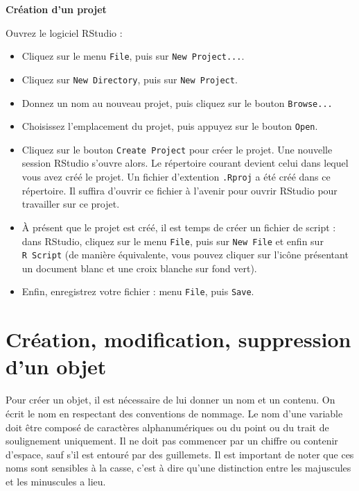 \documentclass[
  11pt,
]{book}
\providecommand{\tightlist}{%
  \setlength{\itemsep}{0pt}\setlength{\parskip}{0pt}}
\numberwithin{equation}{section}
\numberwithin{countremarque}{section}
\newenvironment{greenbox}{
  \begin{tcolorbox}[breakable, colback=vert,coltext=black,
                  colframe=grisfonce]}
 {\end{tcolorbox}}
\begin{document}
\begin{greenbox}

\textbf{Création d'un projet}

Ouvrez le logiciel RStudio :

\begin{itemize}
\tightlist
\item
  Cliquez sur le menu \texttt{File}, puis sur \texttt{New\ Project...}.
\item
  Cliquez sur \texttt{New\ Directory}, puis sur \texttt{New\ Project}.
\item
  Donnez un nom au nouveau projet, puis cliquez sur le bouton \texttt{Browse...}
\item
  Choisissez l'emplacement du projet, puis appuyez sur le bouton \texttt{Open}.
\item
  Cliquez sur le bouton \texttt{Create\ Project} pour créer le projet. Une nouvelle session RStudio s'ouvre alors. Le répertoire courant devient celui dans lequel vous avez créé le projet. Un fichier d'extention \texttt{.Rproj} a été créé dans ce répertoire. Il suffira d'ouvrir ce fichier à l'avenir pour ouvrir RStudio pour travailler sur ce projet.
\item
  À présent que le projet est créé, il est temps de créer un fichier de script : dans RStudio, cliquez sur le menu \texttt{File}, puis sur \texttt{New\ File} et enfin sur \texttt{R\ Script} (de manière équivalente, vous pouvez cliquer sur l'icône présentant un document blanc et une croix blanche sur fond vert).
\item
  Enfin, enregistrez votre fichier : menu \texttt{File}, puis \texttt{Save}.
\end{itemize}

\end{greenbox}

\hypertarget{cruxe9ation-modification-suppression-dun-objet}{%
\section{Création, modification, suppression d'un objet}\label{cruxe9ation-modification-suppression-dun-objet}}

Pour créer un objet, il est nécessaire de lui donner un nom et un contenu. On écrit le nom en respectant des conventions de nommage. Le nom d'une variable doit être composé de caractères alphanumériques ou du point ou du trait de soulignement uniquement. Il ne doit pas commencer par un chiffre ou contenir d'espace, sauf s'il est entouré par des guillemets. Il est important de noter que ces noms sont sensibles à la casse, c'est à dire qu'une distinction entre les majuscules et les minuscules a lieu.
\end{document}
